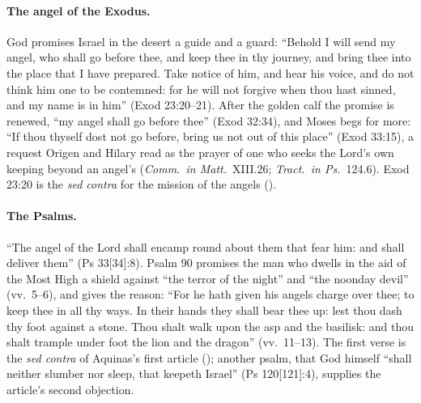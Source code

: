\paragraph{The angel of the Exodus.} God promises Israel in the desert a
guide and a guard: ``Behold I will send my angel, who shall go before thee,
and keep thee in thy journey, and bring thee into the place that I have
prepared. Take notice of him, and hear his voice, and do not think him one
to be contemned: for he will not forgive when thou hast sinned, and my name
is in him'' (Exod 23:20--21). After the golden calf the promise is renewed, ``my angel shall go before thee'' (Exod 32:34), and
Moses begs for more: ``If thou thyself dost not go before, bring us not out
of this place'' (Exod 33:15), a request Origen and Hilary read as the prayer
of one who seeks the Lord's own keeping beyond an angel's (\emph{Comm.\ in
Matt.}\ XIII.26; \emph{Tract.\ in Ps.}\ 124.6). Exod 23:20 is the \emph{sed
contra} for the mission of the angels ().

\paragraph{The Psalms.} ``The angel of the Lord shall encamp round about them
that fear him: and shall deliver them'' (Ps 33[34]:8). Psalm 90 promises the
man who dwells in the aid of the Most High a shield against ``the terror of
the night'' and ``the noonday devil'' (vv.~5--6), and gives the reason: ``For he hath given his angels
charge over thee; to keep thee in all thy ways. In their hands they shall
bear thee up: lest thou dash thy foot against a stone. Thou shalt walk upon
the asp and the basilisk: and thou shalt trample under foot the lion and the
dragon'' (vv.~11--13). The first verse is the \emph{sed contra} of
Aquinas's first article (); another psalm, that God himself
``shall neither slumber nor sleep, that keepeth Israel'' (Ps 120[121]:4),
supplies the article's second objection.


